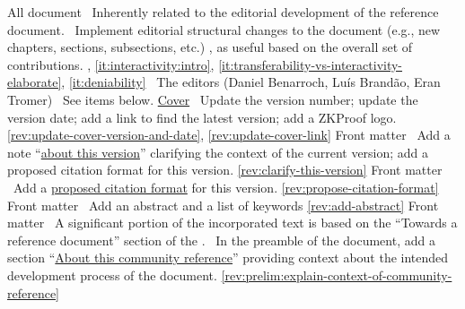 All document
\newcol \ccontext\ Inherently related to the editorial development of the reference document. 
				\propContrib\ Implement editorial structural changes to the document (e.g., new chapters, 
				sections, subsections, etc.) , as useful based on the overall set of contributions.
\newcol {}, \ref{it:interactivity:intro}, \ref{it:transferability-vs-interactivity-elaborate}, \ref{it:deniability}
\newcol \contributors\ The editors (Daniel Benarroch, Luís Brandão, Eran Tromer)
				\Chan\ See items below.
\newcol 
\rowendL
\hyperref[prelim:cover]{Cover}
\newcol 
\newcol {}
\newcol \Chan\ Update the version number; update the version date; add a link to find the latest version; add a ZKProof logo.
\newcol \ref{rev:update-cover-version-and-date}, \ref{rev:update-cover-link}
\rowendL
Front matter
\newcol 
\newcol {}
\newcol \Chan\ Add a note ``\hyperref[sec:prelim:msg-editors]{about this version}'' clarifying the context of the current version; add a proposed citation format for this version.
\newcol \ref{rev:clarify-this-version}
\rowendL
Front matter
\newcol 
\newcol {}
\newcol \Chan\ Add a \hyperref[how-to-cite-this-version]{proposed citation format} for this version.
\newcol \ref{rev:propose-citation-format}
\rowendL
Front matter
\newcol 
\newcol {}
\newcol \Chan\ Add an abstract and a list of keywords
\newcol \ref{rev:add-abstract}
\rowendL
Front matter
\newcol \ccontext\ A significant portion of the incorporated text 
is based on the ``Towards a reference document'' section of the \NISTcomments.
\newcol {}
\newcol \Chan\ In the preamble of the document, add a section ``\hyperref[sec:prelim:about-this-community-reference]{About this community reference}'' providing context about the intended development process of the document.
\newcol \ref{rev:prelim:explain-context-of-community-reference}
